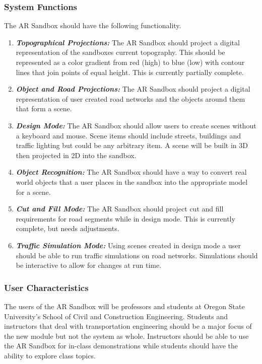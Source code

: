 \documentclass[letterpaper, 10pt, onecolumn, draftclsnofoot]{IEEEtran}
\begin{document}
        \subsubsection{\textbf{System Functions}}
        The AR Sandbox should have the following functionality.
        \begin{enumerate}[\label={}]
            \item {\textbf{\emph{Topographical Projections:}} The AR Sandbox should project a digital representation of the sandboxes current topography. This should be represented as a color gradient from red (high) to blue (low) with contour lines that join points of equal height. This is currently partially complete.}
            
            \item {\textbf{\emph{Object and Road Projections:}} The AR Sandbox should project a digital representation of user created road networks and the objects around them that form a scene.}
            
            \item {\textbf{\emph{Design Mode:}} The AR Sandbox should allow users to create scenes without a keyboard and mouse. Scene items should include streets, buildings and traffic lighting but could be any arbitrary item. A scene will be built in 3D then projected in 2D into the sandbox.}
            
            \item {\textbf{\emph{Object Recognition:}} The AR Sandbox should have a way to convert real world objects that a user places in the sandbox into the appropriate model for a scene.}
            
            \item {\textbf{\emph{Cut and Fill Mode:}} The AR Sandbox should project cut and fill requirements for road segments while in design mode. This is currently complete, but needs adjustments.}

            \item {\textbf{\emph{Traffic Simulation Mode:}} Using scenes created in design mode a user should be able to run traffic simulations on road networks. Simulations should be interactive to allow for changes at run time.}
        \end{enumerate}
        
        \subsubsection{\textbf{User Characteristics}}
        The users of the AR Sandbox will be professors and students at Oregon State University's School of Civil and Construction Engineering. Students and instructors that deal with transportation engineering should be a major focus of the new module but not the system as whole. Instructors should be able to use the AR Sandbox for in-class demonstrations while students should have the ability to explore class topics. 
        
\end{document}
